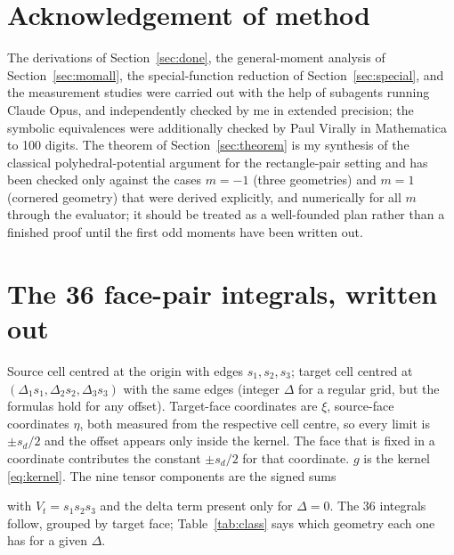 \documentclass[11pt]{article}
\theoremstyle{remark}
\begin{document}
\section*{Acknowledgement of method}

The derivations of Section~\ref{sec:done}, the general-moment analysis of
Section~\ref{sec:momall}, the special-function reduction of Section~\ref{sec:special},
and the measurement studies were
carried out with the help of subagents running Claude Opus, and independently
checked by me in extended precision; the symbolic equivalences were additionally
checked by Paul Virally in Mathematica to 100 digits. The theorem of
Section~\ref{sec:theorem} is my synthesis of the classical polyhedral-potential
argument for the rectangle-pair setting and has been checked only against the cases
$m = -1$ (three geometries) and $m = 1$ (cornered geometry) that were derived
explicitly, and numerically for all $m$ through the evaluator; it should be treated
as a well-founded plan rather than a finished proof until the first odd moments have
been written out.

\appendix
\section{The 36 face-pair integrals, written out}
\label{app:36}

Source cell centred at the origin with edges $s_1, s_2, s_3$; target cell centred at
$(\Delta_1 s_1, \Delta_2 s_2, \Delta_3 s_3)$ with the same edges (integer $\Delta$ for
a regular grid, but the formulas hold for any offset). Target-face coordinates are
$\xi$, source-face coordinates $\eta$, both measured from the respective cell centre,
so every limit is $\pm s_d/2$ and the offset appears only inside the kernel. The face
that is fixed in a coordinate contributes the constant $\pm s_d/2$ for that coordinate.
$g$ is the kernel \eqref{eq:kernel}. The nine tensor components are the signed sums

with $V_t = s_1 s_2 s_3$ and the delta term present only for $\Delta = 0$. The 36
integrals follow, grouped by target face; Table~\ref{tab:class} says which geometry
each one has for a given $\Delta$.

\begin{landscape}
\footnotesize

\end{landscape}
\end{document}
